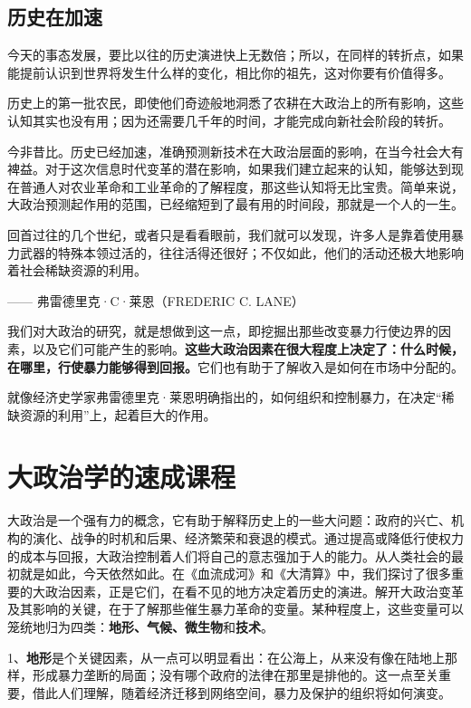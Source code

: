 \subsection{历史在加速}
今天的事态发展，要比以往的历史演进快上无数倍；所以，在同样的转折点，如果能提前认识到世界将发生什么样的变化，相比你的祖先，这对你要有价值得多。

历史上的第一批农民，即使他们奇迹般地洞悉了农耕在大政治上的所有影响，这些认知其实也没有用；因为还需要几千年的时间，才能完成向新社会阶段的转折。

今非昔比。历史已经加速，准确预测新技术在大政治层面的影响，在当今社会大有裨益。对于这次信息时代变革的潜在影响，如果我们建立起来的认知，能够达到现在普通人对农业革命和工业革命的了解程度，那这些认知将无比宝贵。简单来说，大政治预测起作用的范围，已经缩短到了最有用的时间段，那就是一个人的一生。


\begin{tcolorbox}
\kaishu 回首过往的几个世纪，或者只是看看眼前，我们就可以发现，许多人是靠着使用暴力武器的特殊本领过活的，往往活得还很好；不仅如此，他们的活动还极大地影响着社会稀缺资源的利用。
\begin{flushright}
—— 弗雷德里克·C·莱恩（FREDERIC C. LANE） 
\end{flushright}
\end{tcolorbox}

我们对大政治的研究，就是想做到这一点，即挖掘出那些改变暴力行使边界的因素，以及它们可能产生的影响。\textbf{这些大政治因素在很大程度上决定了：什么时候，在哪里，行使暴力能够得到回报。}它们也有助于了解收入是如何在市场中分配的。

就像经济史学家弗雷德里克·莱恩明确指出的，如何组织和控制暴力，在决定“稀缺资源的利用”上，起着巨大的作用。

\section{大政治学的速成课程}
大政治是一个强有力的概念，它有助于解释历史上的一些大问题：政府的兴亡、机构的演化、战争的时机和后果、经济繁荣和衰退的模式。通过提高或降低行使权力的成本与回报，大政治控制着人们将自己的意志强加于人的能力。从人类社会的最初就是如此，今天依然如此。在《血流成河》和《大清算》中，我们探讨了很多重要的大政治因素，正是它们，在看不见的地方决定着历史的演进。解开大政治变革及其影响的关键，在于了解那些催生暴力革命的变量。某种程度上，这些变量可以笼统地归为四类：\textbf{地形、气候、微生物}和\textbf{技术}。

1、\textbf{地形}是个关键因素，从一点可以明显看出：在公海上，从来没有像在陆地上那样，形成暴力垄断的局面；没有哪个政府的法律在那里是排他的。这一点至关重要，借此人们理解，随着经济迁移到网络空间，暴力及保护的组织将如何演变。

